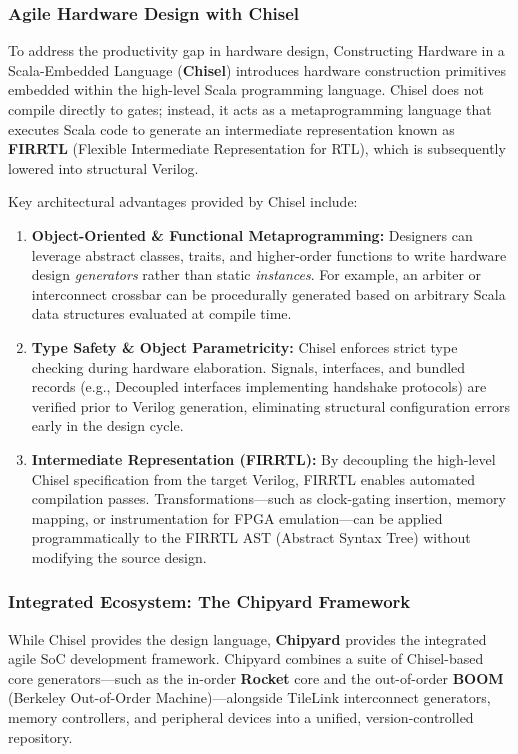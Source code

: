 \documentclass[12pt,a4paper]{article}
\begin{document}
\subsubsection{Agile Hardware Design with Chisel}
To address the productivity gap in hardware design, Constructing Hardware in a Scala-Embedded Language (\textbf{Chisel}) introduces hardware construction primitives embedded within the high-level Scala programming language. Chisel does not compile directly to gates; instead, it acts as a metaprogramming language that executes Scala code to generate an intermediate representation known as \textbf{FIRRTL} (Flexible Intermediate Representation for RTL), which is subsequently lowered into structural Verilog.

Key architectural advantages provided by Chisel include:

\begin{enumerate}
    \item \textbf{Object-Oriented \& Functional Metaprogramming:} Designers can leverage abstract classes, traits, and higher-order functions to write hardware design \textit{generators} rather than static \textit{instances}. For example, an arbiter or interconnect crossbar can be procedurally generated based on arbitrary Scala data structures evaluated at compile time.
    \item \textbf{Type Safety \& Object Parametricity:} Chisel enforces strict type checking during hardware elaboration. Signals, interfaces, and bundled records (e.g., Decoupled interfaces implementing handshake protocols) are verified prior to Verilog generation, eliminating structural configuration errors early in the design cycle.
    \item \textbf{Intermediate Representation (FIRRTL):} By decoupling the high-level Chisel specification from the target Verilog, FIRRTL enables automated compilation passes. Transformations—such as clock-gating insertion, memory mapping, or instrumentation for FPGA emulation—can be applied programmatically to the FIRRTL AST (Abstract Syntax Tree) without modifying the source design.
\end{enumerate}

\subsubsection{Integrated Ecosystem: The Chipyard Framework}
While Chisel provides the design language, \textbf{Chipyard} provides the integrated agile SoC development framework. Chipyard combines a suite of Chisel-based core generators—such as the in-order \textbf{Rocket} core and the out-of-order \textbf{BOOM} (Berkeley Out-of-Order Machine)—alongside TileLink interconnect generators, memory controllers, and peripheral devices into a unified, version-controlled repository.
\end{document}
